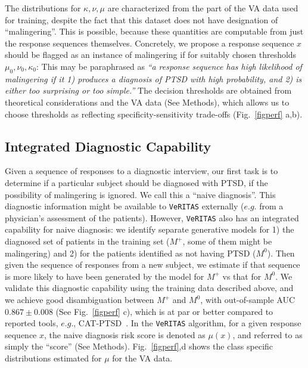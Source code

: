\documentclass[onecolumn,10pt]{IEEEtran}
\def\Methods{Online Methods}
\def\Methods{Methods\xspace}
\def\vrts{\texttt{VeRITAS}\xspace}
\def\Mpos{M^+}
\def\Mcont{M^0}
\def\x{x}
\begin{document}
The distributions for  $\kappa, \nu, \mu$   are characterized from the part of the  VA data used for training, despite the fact that this dataset does not have  designation of ``malingering''. This is possible, because these quantities are computable from just the response sequences themselves.  Concretely, we propose  a response sequence $\x$  should be flagged as an instance of malingering if for  suitably chosen thresholds $\mu_0,\nu_0, \kappa_0$:
This may be paraphrased as \textit{``a response sequence has high likelihood of malingering if it 1)  produces a diagnosis of PTSD with high probability, and 2) is either too surprising or too simple.''} The decision thresholds are obtained from theoretical considerations and the VA data (See \Methods), which allows us to choose thresholds as reflecting specificity-sensitivity trade-offs (Fig.~\ref{figperf} a,b).
  
\subsection*{Integrated Diagnostic Capability}

Given a sequence of responses to a diagnostic interview, our first task is to determine if a particular subject should be diagnosed with PTSD,  if the possibility of malingering is ignored. We call this a ``naive diagnosis''. This diagnostic information might be available to \vrts externally ($e.g.$ from a physician's assessment of the patients). However, \vrts also has an integrated capability for naive diagnosis: we identify separate  generative models for 1) the diagnosed set of patients in the training set ($\Mpos$, some of them might be malingering) and 2) for the patients identified as not having PTSD ($\Mcont$). Then given the sequence of responses from a new subject, we estimate if that sequence is more likely to have been generated by the model for  $\Mpos$ vs that for $\Mcont$.  We validate this diagnostic capability using the training data described above, and we achieve good disambiguation between $\Mpos$ and $\Mcont$, with out-of-sample AUC  {\color{Red1}$0.867\pm 0.008$} (See Fig.~\ref{figperf} c), which is at par or better compared to reported tools, $e.g.$,  CAT-PTSD~\cite{Brenner_2021}. In the \vrts algorithm, for a given response sequence $\x$, the naive diagnosis risk score is denoted as $\mu(x)$, and referred to as simply the ``score'' (See \Methods). Fig.~\ref{figperf},d shows the class specific distributions estimated for $\mu$ for the VA data. 
\end{document}
